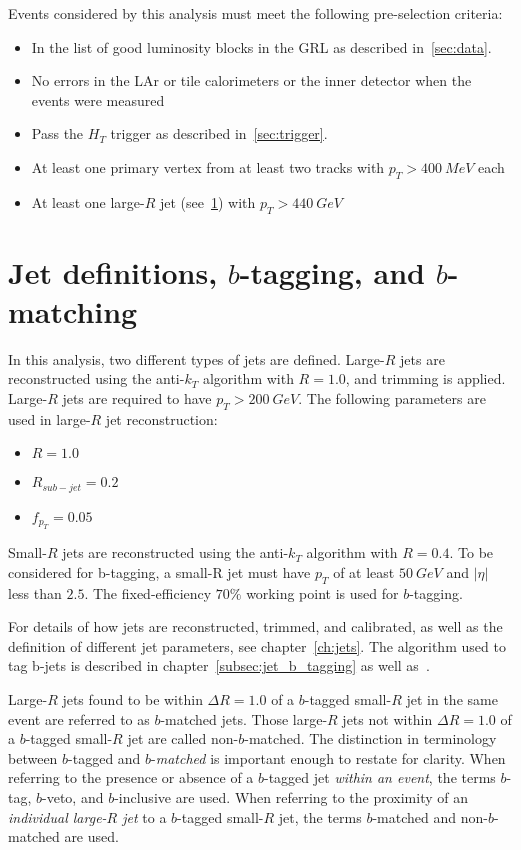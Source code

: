Events considered by this analysis must meet the following pre-selection criteria:

\begin{itemize}
    \item In the list of good luminosity blocks in the GRL as described in~\ref{sec:data}.
    \item No errors in the LAr or tile calorimeters or the inner detector when the events were measured
    \item Pass the $H_{T}$ trigger as described in~\ref{sec:trigger}.
    \item At least one primary vertex from at least two tracks with $p_{T}>400~MeV$ each
    \item At least one large-$R$ jet (see~\ref{sec:jet_definitions}) with $p_{T}>440~GeV$
\end{itemize}

\section{Jet definitions, $b$-tagging, and $b$-matching}\label{sec:jet_definitions}

In this analysis, two different types of jets are defined.
Large-$R$ jets are reconstructed using the anti-$k_{T}$ algorithm with $R=1.0$, and trimming is applied.
Large-$R$ jets are required to have $p_{T}>200~GeV$.
The following parameters are used in large-$R$ jet reconstruction:

\begin{itemize}
    \item $R=1.0$
    \item $R_{sub-jet}=0.2$
    \item $f_{p_{T}}=0.05$
\end{itemize}

Small-$R$ jets are reconstructed using the anti-$k_{T}$ algorithm with $R=0.4$.
To be considered for b-tagging, a small-R jet must have $p_{T}$ of at least $50~GeV$ and $|\eta|$ less than $2.5$.
The fixed-efficiency $70\%$ working point is used for $b$-tagging.

For details of how jets are reconstructed, trimmed, and calibrated, as well as the definition of different jet parameters, see chapter~\ref{ch:jets}.
The algorithm used to tag b-jets is described in chapter~\ref{subsec:jet_b_tagging} as well as~\cite{b-jet-perf-1,b-jet-perf-2}.

Large-$R$ jets found to be within $\Delta R=1.0$ of a $b$-tagged small-$R$ jet in the same event are referred to as $b$-matched jets.
Those large-$R$ jets not within $\Delta R=1.0$ of a $b$-tagged small-$R$ jet are called non-$b$-matched.
The distinction in terminology between $b$-tagged and $b$-\textit{matched} is important enough to restate for clarity.
When referring to the presence or absence of a $b$-tagged jet \textit{within an event}, the terms $b$-tag, $b$-veto, and $b$-inclusive are used.
When referring to the proximity of an \textit{individual large-$R$ jet} to a $b$-tagged small-$R$ jet, the terms $b$-matched and non-$b$-matched are used.

